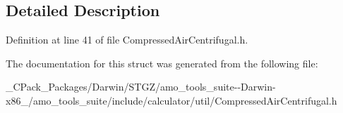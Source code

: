 \subsection{Detailed Description}


Definition at line 41 of file Compressed\+Air\+Centrifugal.\+h.



The documentation for this struct was generated from the following file\+:\begin{DoxyCompactItemize}
\item 
\+\_\+\+C\+Pack\+\_\+\+Packages/\+Darwin/\+S\+T\+G\+Z/amo\+\_\+tools\+\_\+suite-\/-\/\+Darwin-\/x86\+\_/amo\+\_\+tools\+\_\+suite/include/calculator/util/Compressed\+Air\+Centrifugal.\+h\end{DoxyCompactItemize}
